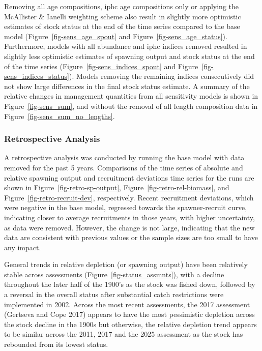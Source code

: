 \documentclass[
]{scrartcl}
\begin{document}
Removing all age compositions, \gls{iphc} age compositions only or
applying the McAllister \& Ianelli weighting scheme also result in
slightly more optimistic estimates of stock status at the end of the
time series compared to the base model (Figure~\ref{fig-sens_age_spout}
and Figure~\ref{fig-sens_age_status}). Furthermore, models with all
abundance and \gls{iphc} indices removed resulted in slightly less
optimistic estimates of spawning output and stock status at the end of
the time series (Figure~\ref{fig-sens_indices_spout} and
Figure~\ref{fig-sens_indices_status}). Models removing the remaining
indices consecutively did not show large differences in the final stock
status estimate. A summary of the relative changes in management
quantities from all sensitivity models is shown in
Figure~\ref{fig-sens_sum}, and without the removal of all length
composition data in Figure~\ref{fig-sens_sum_no_lengths}.

\subsubsection{Retrospective Analysis}\label{retrospective-analysis}

A retrospective analysis was conducted by running the base model with
data removed for the past 5 years. Comparisons of the time series of
absolute and relative spawning output and recruitment deviations time
series for the runs are shown in Figure~\ref{fig-retro-sp-output},
Figure~\ref{fig-retro-rel-biomass}, and
Figure~\ref{fig-retro-recruit-dev}, respectively. Recent recruitment
deviations, which were negative in the base model, regressed towards the
spawner-recruit curve, indicating closer to average recruitments in
those years, with higher uncertainty, as data were removed. However, the
change is not large, indicating that the new data are consistent with
previous values or the sample sizes are too small to have any impact.

General trends in relative depletion (or spawning output) have been
relatively stable across assessments (Figure~\ref{fig-status_assmnts}),
with a decline throughout the later half of the 1900's as the stock was
fished down, followed by a reversal in the overall status after
substantial catch restrictions were implemented in 2002. Across the most
recent assessments, the 2017 assessment (Gertseva and Cope 2017) appears
to have the most pessimistic depletion across the stock decline in the
1900s but otherwise, the relative depletion trend appears to be similar
across the 2011, 2017 and the 2025 assessment as the stock has rebounded
from its lowest status.
\end{document}
